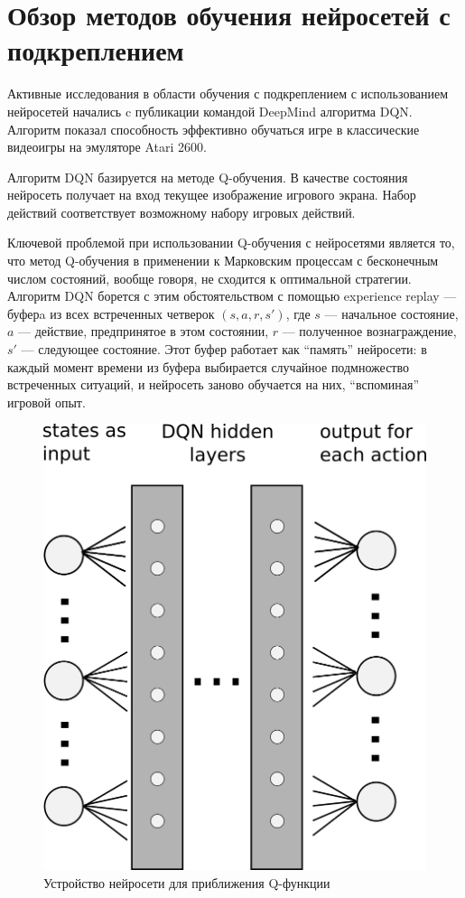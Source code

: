 \documentclass[specification, annotation]{itmo-student-thesis}
\begin{document}
\section{Обзор методов обучения нейросетей с подкреплением}

Активные исследования в области обучения с подкреплением с использованием
нейросетей начались c публикации командой DeepMind алгоритма
DQN\cite{deepmind-dqn-orig}. Алгоритм показал способность эффективно обучаться
игре в классические видеоигры на эмуляторе Atari 2600. 

Алгоритм DQN базируется на методе Q-обучения. В качестве состояния нейросеть
получает на вход текущее изображение игрового экрана. Набор действий
соответствует возможному набору игровых действий.

Ключевой проблемой при использовании Q-обучения с нейросетями является то, что
метод Q-обучения в применении к Марковским процессам с бесконечным числом
состояний, вообще говоря, не сходится к оптимальной стратегии. Алгоритм DQN
борется с этим обстоятельством с помощью experience
replay --- буферa из всех встреченных четверок $(s, a, r, s')$, где $s$ ---
начальное состояние, $a$ --- действие, предпринятое в этом состоянии, $r$ ---
полученное вознаграждение, $s'$ --- следующее состояние. Этот буфер работает как
``память'' нейросети: в каждый момент времени из буфера выбирается случайное
подмножество встреченных ситуаций, и нейросеть заново обучается на них,
``вспоминая'' игровой опыт.

\begin{figure}[!h]
  \caption{Устройство нейросети для приближения Q-функции}\label{dqn-scheme}
  \centering
  \includegraphics{dqn-scheme}
\end{figure}
\end{document}

